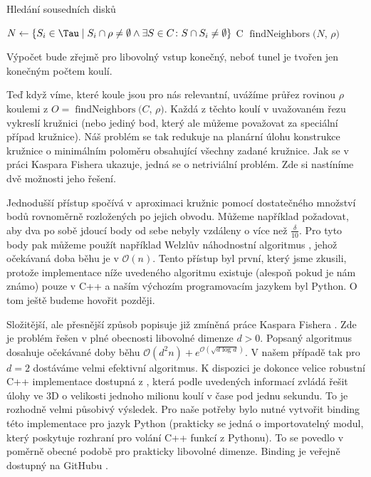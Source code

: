 \begin{algorithm}
\caption{Hledání sousedních disků}
\label{alg:findNeighbors}
\begin{algorithmic}[1]

    \State $ N \gets \{ S_i \in \Tau \mid S_i \cap \rho \neq \emptyset
        \wedge \exists S \in C \colon S \cap S_i \neq \emptyset \} $
        \State \Return C
    \Else
        \State \Return $\operatorname{findNeighbors}(N$, $\rho)$
    \EndIf
\EndFunction

\end{algorithmic}
\end{algorithm}

Výpočet bude zřejmě pro libovolný vstup konečný, neboť tunel je tvořen jen konečným
počtem koulí.

Teď když víme, které koule jsou pro nás relevantní, uvážíme průřez rovinou
$ \rho $ koulemi z $ O = \operatorname{findNeighbors}(C$, $\rho)$.
Každá z těchto koulí v uvažovaném řezu vykreslí
kružnici (nebo jediný bod, který ale můžeme považovat za speciální případ kružnice).
Náš problém se tak redukuje na planární úlohu konstrukce kružnice o minimálním poloměru
obsahující všechny zadané kružnice. Jak se v práci Kaspara Fishera \cite{FisherBalls} ukazuje,
jedná se o netriviální problém. Zde si nastíníme dvě možnosti jeho řešení.

Jednodušší přístup spočívá v aproximaci kružnic pomocí dostatečného množství bodů
rovnoměrně rozložených po jejich obvodu. Můžeme například požadovat, aby dva
po sobě jdoucí body od sebe nebyly vzdáleny o více než $ \frac{\delta}{10} $.
Pro tyto body pak můžeme použít například Welzlův náhodnostní algoritmus
\cite{WelzlRandom}, jehož očekávaná doba běhu je v $ \mathcal{O}(n) $. Tento
přístup byl první, který jsme zkusili, protože implementace níže uvedeného algoritmu
existuje (alespoň pokud je nám známo) pouze v C++ a naším výchozím programovacím
jazykem byl Python. O tom ještě budeme hovořit později.

Složitější, ale přesnější způsob popisuje již zmíněná práce Kaspara Fishera
\cite{FisherBalls}. Zde je problém řešen v plné obecnosti libovolné dimenze $ d > 0 $.
Popsaný algoritmus dosahuje očekávané doby běhu
$ \mathcal{O}(d^2n) + e^{\mathcal{O}(\sqrt{d \log{d}})} $. V našem případě tak pro
$ d = 2 $ dostáváme velmi efektivní algoritmus. K dispozici je dokonce velice
robustní C++ implementace dostupná z \cite{cpp_balls}, která podle uvedených informací
zvládá řešit úlohy ve 3D o velikosti jednoho milionu koulí v čase pod jednu sekundu. To
je rozhodně velmi působivý výsledek. Pro naše potřeby bylo nutné vytvořit
binding této implementace pro jazyk Python (prakticky se jedná o importovatelný modul,
který poskytuje rozhraní pro volání C++ funkcí z Pythonu). To se povedlo v poměrně obecné
podobě pro prakticky libovolné dimenze. Binding je veřejně dostupný na GitHubu
\cite{python_balls}.


